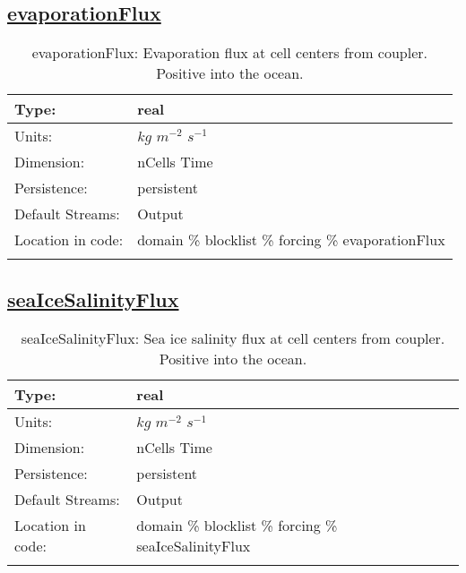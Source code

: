 \subsection[evaporationFlux]{\hyperref[sec:var_tab_forcing]{evaporationFlux}}
\label{subsec:var_sec_forcing_evaporationFlux}
\begin{center}
\begin{longtable}{| p{2.0in} | p{4.0in} |}
        \hline 
        Type: & real \\
        \hline 
        Units: & $kg$ $m^{-2}$ $s^{-1}$ \\
        \hline 
        Dimension: & nCells Time \\
        \hline 
        Persistence: & persistent \\
        \hline 
		 Default Streams: & Output  \\
        \hline 
		 Location in code: & domain \% blocklist \% forcing \% evaporationFlux \\
		 \hline 
    \caption{evaporationFlux: Evaporation flux at cell centers from coupler. Positive into the ocean.}
\end{longtable}
\end{center}
\subsection[seaIceSalinityFlux]{\hyperref[sec:var_tab_forcing]{seaIceSalinityFlux}}
\label{subsec:var_sec_forcing_seaIceSalinityFlux}
\begin{center}
\begin{longtable}{| p{2.0in} | p{4.0in} |}
        \hline 
        Type: & real \\
        \hline 
        Units: & $kg$ $m^{-2}$ $s^{-1}$ \\
        \hline 
        Dimension: & nCells Time \\
        \hline 
        Persistence: & persistent \\
        \hline 
		 Default Streams: & Output  \\
        \hline 
		 Location in code: & domain \% blocklist \% forcing \% seaIceSalinityFlux \\
		 \hline 
    \caption{seaIceSalinityFlux: Sea ice salinity flux at cell centers from coupler. Positive into the ocean.}
\end{longtable}
\end{center}
